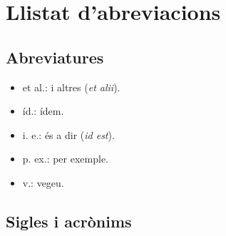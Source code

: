 \documentclass[CAT]{TFUOC}%
\providecommand{\tightlist}{\setlength{\itemsep}{0pt}\setlength{\parskip}{0pt}}
\begin{document}
\newpage
\appendix

\chapter{Llistat d'abreviacions}\label{llistat-dabreviacions}

\section{Abreviatures}\label{abreviatures}

\begin{itemize}
\tightlist
\item
  et al.: i altres (\emph{et alii}).
\item
  íd.: ídem.
\item
  i. e.: és a dir (\emph{id est}).
\item
  p. ex.: per exemple.
\item
  v.: vegeu.
\end{itemize}

\section{Sigles i acrònims}\label{sigles-i-acruxf2nims}
\end{document}
